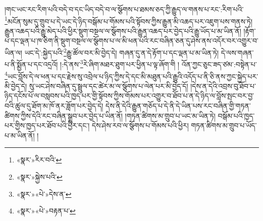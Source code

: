 །གང་ཡང་རང་རིག་པའི་བདེ་བ་དང་ཡིད་བདེ་བ་ལ་སྩོགས་པ་ཐམས་ཅད་ཀྱི་རྒྱུད་ལ་གནས་པ་རང་:རིག་པའི་\footnote{«སྣར་»རིར་བའི་}མངོན་སུམ་དུ་གྲུབ་པ་དེ་ཡང་དེ་ཉིད་བསྒོམ་པ་གོམས་པའི་སྟོབས་ཀྱིས་རྒྱུན་མི་འཆད་པར་འཇུག་པས་གནས་ཏེ། རྒྱུན་འཆད་པའི་རྒྱུ་མེད་པའི་ཕྱིར་སྡུག་བསྔལ་ལ་སྩོགས་པའི་རྒྱུན་འཆད་པར་བྱེད་པའི་རྒྱུ་ཡོད་པ་མ་ཡིན་ནོ། །རྟོག་པ་དང་ལྡན་པ་ཁ་ཅིག་ནི་སྡུག་བསྔལ་ལ་སྩོགས་པ་ལ་མི་ཕན་པའི་རང་བཞིན་ཅན་དུ་ཤེས་ནས་འདོར་བར་འགྱུར་བ་ཡིན་ལ། ཡང་དེ་:སྐྱེད་པའི་\footnote{«སྣར་»སྐྱེས་པའི་}རྒྱུ་ཚོལ་བར་མི་བྱེད་དེ། གཞན་དུ་ན་དེ་རྟོག་པ་དང་ལྡན་པ་མ་ཡིན་ཏེ། དེ་ལས་གཞན་པ་ནི་སྨྱོན་པ་དང་འདྲའོ། །:དེ་ནས་\footnote{«སྣར་»«པེ་»དེས་ན་}རེ་ཞིག་མཐར་ཐུག་པར་ཕྱིན་པ་ལྟ་ཞོག་གི ། འོན་ཀྱང་ཅུང་ཟད་ཙམ་:བསྟེན་པ་\footnote{«སྣར་»«པེ་»བརྟན་པ་}ཡང་བློས་དེ་ལ་ཕན་པ་དང་རྗེས་སུ་འབྲེལ་པ་ཉིད་ཀྱིས་དེ་དང་མི་མཐུན་པའི་རྒྱུའི་འདོད་པ་ནི་ཅི་ནས་ཀྱང་སྐྱེད་པར་མི་བྱེད་དེ། སུ་ཡང་ཤེས་བཞིན་དུ་སྦྲུལ་དང་ཚེར་མ་ལ་སྩོགས་པ་ལེན་པར་མི་བྱེད་དོ། །དེས་ན་དེའི་འབྲས་བུ་ཐོབ་པ་ཉིད་དངོས་པོ་ལ་བསླབས་པའི་ཁྱད་པར་གྱི་སྟོབས་ཀྱིས་གོམས་པར་འགྱུར་བ་ཐོབ་པ་ན་དེ་ཉིད་ལ་བློས་སྤང་བར་བྱ་བའི་ཚུལ་དུ་ཐོག་མ་ཁོ་ནར་ཟློག་པར་བྱེད་དེ། དེས་ནི་དེའི་རྒྱུན་གཅོད་པ་དེ་ནི་དེ་ཡིན་པས་རང་བཞིན་གྱི་གཏན་ཚིགས་ཀྱིས་དེའི་རང་བཞིན་སྒྲུབ་པར་བྱེད་པ་ཡིན་ནོ། །གཏན་ཚིགས་མ་གྲུབ་པ་ཡང་མ་ཡིན་ཏེ། བསྒོམ་པའི་ཁྱད་པར་གྱིས་ཁྱད་པར་ཐོབ་པའི་ཕྱིར་དང་། དེས་ཤེས་རབ་ལ་སྩོགས་པ་གོམས་པའི་ཕྱིར། གཏན་ཚིགས་མ་གྲུབ་པ་ཡོད་པ་མ་ཡིན་ནོ། །
